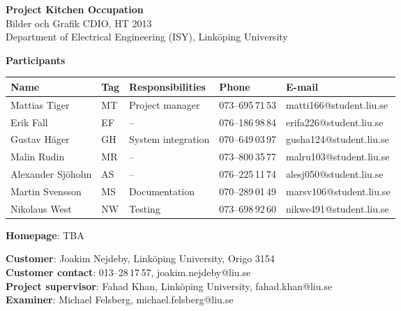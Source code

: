 \begin{center}
    \vspace*{4\baselineskip}

	\textbf{\huge Project Kitchen Occupation} \\
	\vspace*{0.5\baselineskip}
	Bilder och Grafik CDIO, HT 2013 \\
	Department of Electrical Engineering (ISY), Link\"{o}ping University
	
	\vspace*{2\baselineskip}
	\textbf{\LARGE Participants}


	{\footnotesize 
	\begin{tabular}{|p{2.7cm}|p{1cm}|p{5cm}|p{2cm}|p{3.4cm}|}
		\hline
		\textbf{Name} & \textbf{Tag} & \textbf{Responsibilities} & \textbf{Phone} & \textbf{E-mail} \\
		\hline
		Mattias Tiger & MT & Project manager & 073--695\,71\,53 & matti166@student.liu.se \\
		\hline
		Erik Fall & EF & -- & 076--186\,98\,84 & erifa226@student.liu.se \\
		\hline
		Gustav Häger & GH & System integration & 070--649\,03\,97 & gusha124@student.liu.se \\
		\hline
		Malin Rudin & MR & -- & 073--800\,35\,77 & malru103@student.liu.se \\
		\hline
		Alexander Sjöholm & AS & -- & 076--225\,11\,74 & alesj050@student.liu.se \\
		\hline
		Martin Svensson & MS & Documentation & 070--289\,01\,49 & marsv106@student.liu.se \\
		\hline
		Nikolaus West & NW & Testing & 073--698\,92\,60 & nikwe491@student.liu.se \\
		\hline
	\end{tabular}
	}

{\footnotesize 
\vspace{0.5\baselineskip}
\textbf{Homepage}: TBA \\
\vspace{1\baselineskip}

\textbf{Customer}: Joakim Nejdeby, Link\"{o}ping University, Origo 3154 \\
\textbf{Customer contact}: 013--28\,17\,57, joakim.nejdeby@liu.se \\
\textbf{Project supervisor}: Fahad Khan, Link\"{o}ping University, fahad.khan@liu.se \\
\textbf{Examiner}: Michael Felsberg, michael.felsberg@liu.se \\
}

\end{center}
